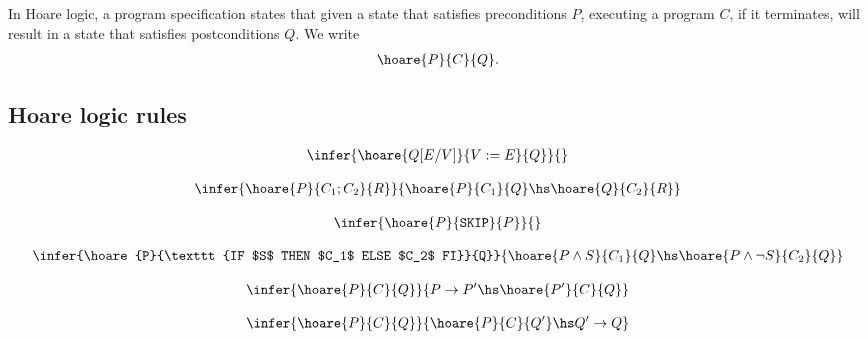 \documentclass{article}
\begin{document}
\begin{definition}
	In Hoare logic, a program specification states that
	given a state that satisfies preconditions $P$, executing a program $C$, if it terminates,
	will result in a state that satisfies postconditions $Q$. We write
	\begin{align*}
		\hoare{P}{C}{Q}.
	\end{align*}
\end{definition}

\subsection{Hoare logic rules}

\begin{definition}
	\begin{align*}
		\infer{\hoare{Q[E/V]}{V:=E}{Q}}{}
	\end{align*}
\end{definition}

\begin{definition}
	\begin{align*}
		\infer{\hoare{P}{C_1; C_2}{R}}{\hoare{P}{C_1}{Q} \hs \hoare{Q}{C_2}{R}}
	\end{align*}
\end{definition}

\begin{definition}
	\begin{align*}
		\infer{\hoare{P}{\texttt{SKIP}}{P}}{}
	\end{align*}
\end{definition}

\begin{definition}
	\begin{align*}
		\infer{\hoare{P}{\texttt{IF $S$ THEN $C_1$ ELSE $C_2$ FI}}{Q}}{
			\hoare{P\wedge S}{C_1}{Q}\hs\hoare{P\wedge\neg S}{C_2}{Q}
		}
	\end{align*}
\end{definition}

\begin{definition}
	\begin{align*}
		\infer{\hoare{P}{C}{Q}}{P\to P'\hs\hoare{P'}{C}{Q}}
	\end{align*}
\end{definition}

\begin{definition}
	\begin{align*}
		\infer{\hoare{P}{C}{Q}}{\hoare{P}{C}{Q'}\hs Q'\to Q}
	\end{align*}
\end{definition}
\end{document}
